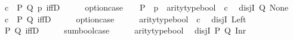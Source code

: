 \begin{isabellebody}
\ \ \ \ {\isachardoublequoteopen}\isactrlbold {\isasymlambda}{\isacharparenleft}{\kern0pt}c{\isacharcolon}{\kern0pt}\ {\isacharunderscore}{\kern0pt}{\isacharparenright}{\kern0pt}\ P\ Q\ p{\isachardot}{\kern0pt}\ iffD{}\ {\isasymcdot}\ {\isacharunderscore}{\kern0pt}\ {\isasymcdot}\ {\isacharunderscore}{\kern0pt}\ {\isasymbullet}\ {\isacharparenleft}{\kern0pt}option{\isachardot}{\kern0pt}case{\isacharunderscore}{\kern0pt}{}\ {\isasymcdot}\ {\isacharunderscore}{\kern0pt}\ {\isasymcdot}\ P\ {\isasymcdot}\ p\ {\isasymbullet}\ arity{\isacharunderscore}{\kern0pt}type{\isacharunderscore}{\kern0pt}bool\ {\isasymbullet}\ c{\isacharparenright}{\kern0pt}{\isachardoublequoteclose}\isanewline
\isanewline
\ \ disjI{}\ {\isacharparenleft}{\kern0pt}Q{\isacharparenright}{\kern0pt}{\isacharcolon}{\kern0pt}\ {\isachardoublequoteopen}None{\isachardoublequoteclose}\isanewline
\ \ \ \ {\isachardoublequoteopen}\isactrlbold {\isasymlambda}{\isacharparenleft}{\kern0pt}c{\isacharcolon}{\kern0pt}\ {\isacharunderscore}{\kern0pt}{\isacharparenright}{\kern0pt}\ P\ Q{\isachardot}{\kern0pt}\ iffD{}\ {\isasymcdot}\ {\isacharunderscore}{\kern0pt}\ {\isasymcdot}\ {\isacharunderscore}{\kern0pt}\ {\isasymbullet}\ {\isacharparenleft}{\kern0pt}option{\isachardot}{\kern0pt}case{\isacharunderscore}{\kern0pt}{}\ {\isasymcdot}\ {\isacharunderscore}{\kern0pt}\ {\isasymcdot}\ {\isacharunderscore}{\kern0pt}\ {\isasymbullet}\ arity{\isacharunderscore}{\kern0pt}type{\isacharunderscore}{\kern0pt}bool\ {\isasymbullet}\ c{\isacharparenright}{\kern0pt}{\isachardoublequoteclose}\isanewline
\isanewline
\ \ disjI{}{\isacharcolon}{\kern0pt}\ {\isachardoublequoteopen}Left{\isachardoublequoteclose}\isanewline
\ \ \ \ {\isachardoublequoteopen}\isactrlbold {\isasymlambda}P\ Q{\isachardot}{\kern0pt}\ iffD{}\ {\isasymcdot}\ {\isacharunderscore}{\kern0pt}\ {\isasymcdot}\ {\isacharunderscore}{\kern0pt}\ {\isasymbullet}\ {\isacharparenleft}{\kern0pt}sumbool{\isachardot}{\kern0pt}case{\isacharunderscore}{\kern0pt}{}\ {\isasymcdot}\ {\isacharunderscore}{\kern0pt}\ {\isasymcdot}\ {\isacharunderscore}{\kern0pt}\ {\isasymbullet}\ arity{\isacharunderscore}{\kern0pt}type{\isacharunderscore}{\kern0pt}bool{\isacharparenright}{\kern0pt}{\isachardoublequoteclose}\isanewline
\isanewline
\ \ disjI{}\ {\isacharparenleft}{\kern0pt}P{\isacharcomma}{\kern0pt}\ Q{\isacharparenright}{\kern0pt}{\isacharcolon}{\kern0pt}\ {\isachardoublequoteopen}Inr{\isachardoublequoteclose}\isanewline

\end{isabellebody}
